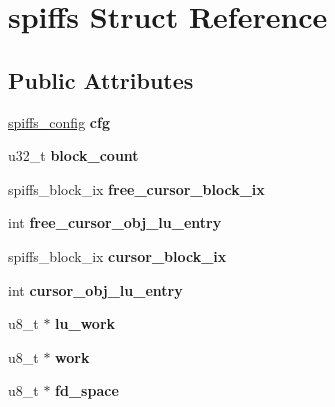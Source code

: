 \hypertarget{structspiffs}{}\section{spiffs Struct Reference}
\label{structspiffs}
\subsection*{Public Attributes}
\begin{DoxyCompactItemize}
\item 
\hypertarget{structspiffs_aaecd3cb7e277fc39a74c2cd8f86b772f}{}\hyperlink{structspiffs__config}{spiffs\+\_\+config} {\bfseries cfg}\label{structspiffs_aaecd3cb7e277fc39a74c2cd8f86b772f}

\item 
\hypertarget{structspiffs_a88afd9b17671aa371112236a65091138}{}u32\+\_\+t {\bfseries block\+\_\+count}\label{structspiffs_a88afd9b17671aa371112236a65091138}

\item 
\hypertarget{structspiffs_a354b299f953d846510f31542623ceaa9}{}spiffs\+\_\+block\+\_\+ix {\bfseries free\+\_\+cursor\+\_\+block\+\_\+ix}\label{structspiffs_a354b299f953d846510f31542623ceaa9}

\item 
\hypertarget{structspiffs_a56ef6fb4975e2c2cd4385ebf96043f63}{}int {\bfseries free\+\_\+cursor\+\_\+obj\+\_\+lu\+\_\+entry}\label{structspiffs_a56ef6fb4975e2c2cd4385ebf96043f63}

\item 
\hypertarget{structspiffs_a3b1a150d6ddc1c43de1607c8f7466452}{}spiffs\+\_\+block\+\_\+ix {\bfseries cursor\+\_\+block\+\_\+ix}\label{structspiffs_a3b1a150d6ddc1c43de1607c8f7466452}

\item 
\hypertarget{structspiffs_a3682b6505837fef78ea650a956869e4b}{}int {\bfseries cursor\+\_\+obj\+\_\+lu\+\_\+entry}\label{structspiffs_a3682b6505837fef78ea650a956869e4b}

\item 
\hypertarget{structspiffs_a69228f18e3814e1155fca0d57f865be5}{}u8\+\_\+t $\ast$ {\bfseries lu\+\_\+work}\label{structspiffs_a69228f18e3814e1155fca0d57f865be5}

\item 
\hypertarget{structspiffs_a5f7937981b67cc014bee616adb644d5c}{}u8\+\_\+t $\ast$ {\bfseries work}\label{structspiffs_a5f7937981b67cc014bee616adb644d5c}

\item 
\hypertarget{structspiffs_aef1b561b7507835a0b02c6b6f6843b6c}{}u8\+\_\+t $\ast$ {\bfseries fd\+\_\+space}\label{structspiffs_aef1b561b7507835a0b02c6b6f6843b6c}


\end{DoxyCompactItemize}
